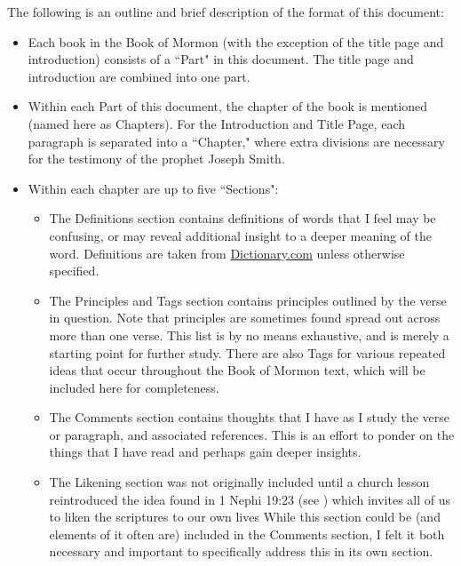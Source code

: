 \documentclass[12pt]{report}
\begin{document}
The following is an outline and brief description of the format of this document:
\begin{itemize}
\item Each book in the Book of Mormon (with the exception of the title page and introduction) consists of a ``Part" in this document.  The title page and introduction are combined into one part.
\item Within each Part of this document, the chapter of the book is mentioned (named here as Chapters).  For the Introduction and Title Page, each paragraph is separated into a ``Chapter," where extra divisions are necessary for the testimony of the prophet Joseph Smith.
\item Within each chapter are up to five ``Sections":
\begin{itemize}
\item The Definitions section contains definitions of words that I feel may be confusing, or may reveal additional insight to a deeper meaning of the word.  Definitions are taken from \href{http://www.dictionary.com}{Dictionary.com} unless otherwise specified.
\item The Principles and Tags section contains principles outlined by the verse in question.  Note that principles are sometimes found spread out across more than one verse.  This list is by no means exhaustive, and is merely a starting point for further study.  There are also Tags for various repeated ideas that occur throughout the Book of Mormon text, which will be included here for completeness.
\item The Comments section contains thoughts that I have as I study the verse or paragraph, and associated references.  This is an effort to ponder on the things that I have read and perhaps gain deeper insights.
\item The Likening section was not originally included until a church lesson reintroduced the idea found in 1 Nephi 19:23 (see ) which invites all of us to liken the scriptures to our own lives  While this section could be (and elements of it often are) included in the Comments section, I felt it both necessary and important to specifically address this in its own section.

\end{itemize}
\end{itemize}
\end{document}
